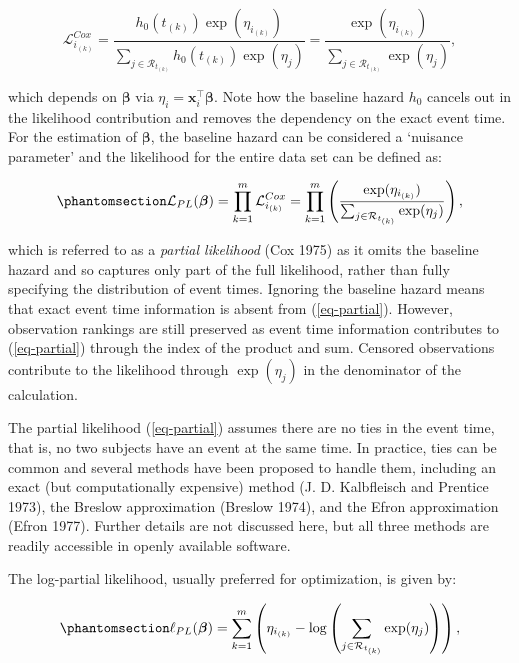 \documentclass[
  letterpaper,
  krantz2]{style/krantz}
\begin{document}
\[
\mathcal{L}^{Cox}_{i_{(k)}}
=\frac{h_0\left(t_{(k)}\right)\exp\left(\eta_{i_{(k)}}\right)}
{\sum_{j\in \mathcal{R}_{t_{(k)}}} h_0\left(t_{(k)}\right)\exp\left(\eta_j\right)}
=\frac{\exp\left(\eta_{i_{(k)}}\right)}
{\sum_{j\in \mathcal{R}_{t_{(k)}}}\exp\left(\eta_j\right)},
\]

which depends on \(\boldsymbol{\beta}\) via
\(\eta_i=\mathbf{x}_i^\top\boldsymbol{\beta}\). Note how the baseline
hazard \(h_0\) cancels out in the likelihood contribution and removes
the dependency on the exact event time. For the estimation of
\(\boldsymbol{\beta}\), the baseline hazard can be considered a
`nuisance parameter' and the likelihood for the
entire data set can be defined as:

\begin{equation}\phantomsection\label{eq-partial}{
\mathcal{L}_{PL}(\boldsymbol{\beta}) = \prod_{k=1}^m \mathcal{L}^{Cox}_{i_{(k)}} = \prod_{k=1}^m \left(\frac{\exp(\eta_{i_{(k)}})}{\sum_{j \in \mathcal{R}_{t_{(k)}}} \exp(\eta_j)}\right),
}\end{equation}

which is referred to as a \emph{partial likelihood} (Cox 1975) as it
omits the baseline hazard and so captures only part of the full
likelihood, rather than fully specifying the distribution of event
times. Ignoring the baseline hazard means that exact event time
information is absent from (\ref{eq-partial}). However, observation
rankings are still preserved as event time information contributes to
(\ref{eq-partial}) through the index of the product and sum. Censored
observations contribute to the likelihood through \(\exp(\eta_j)\) in
the denominator of the calculation.

The partial likelihood (\ref{eq-partial}) assumes there are no ties in
the event time, that is, no two subjects have an event at the same time.
In practice, ties can be common and several methods have been proposed
to handle them, including an exact (but computationally expensive)
method (J. D. Kalbfleisch and Prentice 1973), the Breslow approximation
(Breslow 1974), and the Efron approximation (Efron 1977). Further
details are not discussed here, but all three methods are readily
accessible in openly available software.

The log-partial likelihood, usually preferred for optimization, is given
by:

\begin{equation}\phantomsection\label{eq-lpartial}{
\ell_{PL}(\boldsymbol{\beta}) = \sum_{k=1}^m \left(\eta_{i_{(k)}} - \log \left(\sum_{j \in \mathcal{R}_{t_{(k)}}} \exp(\eta_j)\right)\right),
}\end{equation}
\end{document}
